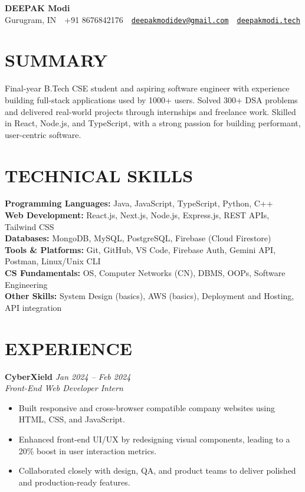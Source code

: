 \documentclass[a4paper,11pt]{article}
\begin{document}
\small
\begin{center}
    {\huge \textbf{DEEPAK Modi}} \\
    \vspace{6pt}
    Gurugram, IN~\textbar~+91 8676842176~\textbar~\href{mailto:deepakmodidev@gmail.com}{\nolinkurl{deepakmodidev@gmail.com}}~\textbar~\href{https://deepakmodi.tech}{\texttt{deepakmodi.tech}}
\end{center}

\section*{SUMMARY}
Final-year B.Tech CSE student and aspiring software engineer with experience building full-stack applications used by 1000+ users. Solved 300+ DSA problems and delivered real-world projects through internships and freelance work. Skilled in React, Node.js, and TypeScript, with a strong passion for building performant, user-centric software.

\section*{TECHNICAL SKILLS}
\textbf{Programming Languages:} Java, JavaScript, TypeScript, Python, C++ \\
\textbf{Web Development:} React.js, Next.js, Node.js, Express.js, REST APIs, Tailwind CSS \\
\textbf{Databases:} MongoDB, MySQL, PostgreSQL, Firebase (Cloud Firestore) \\
\textbf{Tools \& Platforms:} Git, GitHub, VS Code, Firebase Auth, Gemini API, Postman, Linux/Unix CLI \\
\textbf{CS Fundamentals:} OS, Computer Networks (CN), DBMS, OOPs, Software Engineering \\
\textbf{Other Skills:} System Design (basics), AWS (basics), Deployment and Hosting, API integration

\section*{EXPERIENCE}
\textbf{CyberXield} \hfill \textit{Jan 2024 -- Feb 2024} \\
\textit{Front-End Web Developer Intern}
\begin{itemize}
    \item Built responsive and cross-browser compatible company websites using HTML, CSS, and JavaScript.
    \item Enhanced front-end UI/UX by redesigning visual components, leading to a 20\% boost in user interaction metrics.
    \item Collaborated closely with design, QA, and product teams to deliver polished and production-ready features.
\end{itemize}
\end{document}
